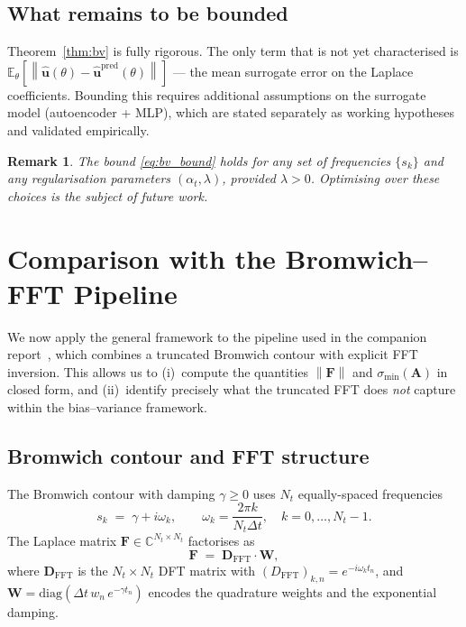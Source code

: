 \documentclass[11pt, a4paper]{article}
\newtheorem{remark}[theorem]{Remark}
\newcommand{\E}{\mathbb{E}}
\newcommand{\norm}[1]{\left\|#1\right\|}
\begin{document}
\subsection{What remains to be bounded}

Theorem~\ref{thm:bv} is fully rigorous. The only term that is not yet
characterised is $\E_\theta[\norm{\hat{\mathbf{u}}(\theta) -
\hat{\mathbf{u}}^{\mathrm{pred}}(\theta)}]$ --- the mean surrogate error
on the Laplace coefficients. Bounding this requires additional assumptions
on the surrogate model (autoencoder + MLP), which are stated separately as
working hypotheses and validated empirically.

\begin{remark}
  The bound \eqref{eq:bv_bound} holds for \emph{any} set of frequencies
  $\{s_k\}$ and any regularisation parameters $(\alpha_t, \lambda)$,
  provided $\lambda > 0$. Optimising over these choices is the subject of future work.
\end{remark}


\section{Comparison with the Bromwich--FFT Pipeline}
 
We now apply the general framework to the pipeline used in the companion
report~\cite{attarian2026}, which combines a truncated Bromwich contour
with explicit FFT inversion. This allows us to (i)~compute the quantities
$\norm{\mathbf{F}}$ and $\sigma_{\min}(\mathbf{A})$ in closed form, and
(ii)~identify precisely what the truncated FFT does \emph{not} capture
within the bias--variance framework.
 
\subsection{Bromwich contour and FFT structure}
 
The Bromwich contour with damping $\gamma \geq 0$ uses $N_t$ equally-spaced
frequencies
\[
  s_k \;=\; \gamma + i\omega_k,
  \qquad
  \omega_k = \frac{2\pi k}{N_t \Delta t},
  \quad k = 0,\ldots,N_t-1.
\]
The Laplace matrix $\mathbf{F} \in \mathbb{C}^{N_t \times N_t}$ factorises as
\begin{equation}
  \label{eq:F_bromwich}
  \mathbf{F} \;=\; \mathbf{D}_{\mathrm{FFT}} \cdot \mathbf{W},
\end{equation}
where $\mathbf{D}_{\mathrm{FFT}}$ is the $N_t\times N_t$ DFT matrix with
$(D_{\mathrm{FFT}})_{k,n} = e^{-i\omega_k t_n}$, and
$\mathbf{W} = \mathrm{diag}(\Delta t\, w_n\, e^{-\gamma t_n})$ encodes the
quadrature weights and the exponential damping.
 
\end{document}

